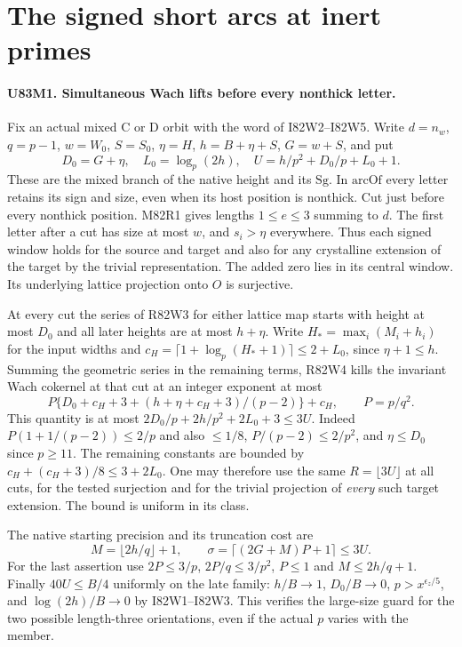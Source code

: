 \section{The signed short arcs at inert primes}

\paragraph{U83M1. Simultaneous Wach lifts before every nonthick letter.}
Fix an actual mixed C or D orbit with the word of I82W2--I82W5.
Write $d=n_w$, $q=p-1$, $w=W_0$, $S=S_0$, $\eta=H$,
$h=B+\eta+S$, $G=w+S$, and put
\[
 D_0=G+\eta,\quad L_0=\log_p(2h),\quad
 U=h/p^2+D_0/p+L_0+1 .
\]
These are the mixed branch of the native height and its $\mathrm{Sg}$.
In $\mathrm{arcOf}$ every letter retains its sign and size, even
when its host position is nonthick. Cut just before every nonthick
position. M82R1 gives lengths $1\le e\le3$ summing to $d$.
The first letter after a cut has size at most $w$, and $s_i>\eta$
everywhere. Thus each signed window holds for the source and target
and also for any crystalline extension of the target by the trivial
representation. The added zero lies in its central window. Its
underlying lattice projection onto $O$ is surjective.

At every cut the series of R82W3 for either lattice map starts
with height at most $D_0$ and all later heights are at most $h+\eta$.
Write $H_* =\max_i (M_i+h_i)$ for the input widths and
$c_H=\lceil1+\log_p(H_*+1)\rceil\le2+L_0$,
since $\eta+1\le h$. Summing the geometric series in the remaining
terms, R82W4 kills the invariant Wach cokernel at that cut at an
integer exponent at most
\[
 P\{D_0+c_H+3+(h+\eta+c_H+3)/(p-2)\}+c_H,
 \qquad P=p/q^2.
\]
This quantity is at most $2D_0/p+2h/p^2+2L_0+3\le3U$.
Indeed $P(1+1/(p-2))\le2/p$ and also $\le1/8$,
$P/(p-2)\le2/p^2$, and $\eta\le D_0$ since $p\ge11$.
The remaining constants are bounded by
$c_H+(c_H+3)/8\le 3+2L_0$.
One may therefore use the same $R=\lfloor3U\rfloor$ at all
cuts, for the tested surjection and for the trivial projection of
\emph{every} such target extension. The bound is uniform in its class.

The native starting precision and its truncation cost are
\[
 M=\lfloor 2h/q\rfloor+1,\qquad
 \sigma=\lceil(2G+M)P+1\rceil\le3U .
\]
For the last assertion use $2P\le3/p$, $2P/q\le3/p^2$,
$P\le1$ and $M\le2h/q+1$. Finally $40U\le B/4$ uniformly
on the late family: $h/B\to1$, $D_0/B\to0$, $p>x^{\epsilon_z/5}$,
and $\log(2h)/B\to0$ by I82W1--I82W3. This verifies the large-size
guard for the two possible length-three orientations, even if the
actual $p$ varies with the member.

